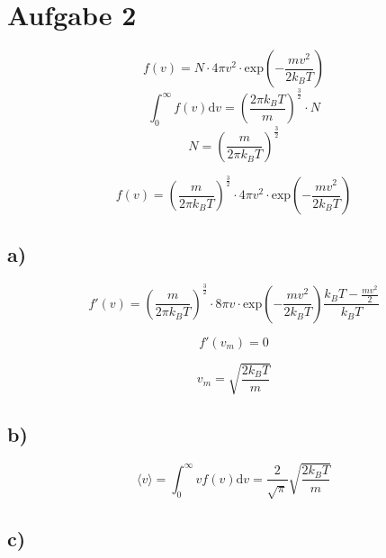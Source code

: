 \section{Aufgabe 2}
\label{sec:Aufgabe2}

\begin{equation}
  f(v)=N\cdot 4\pi v^2 \cdot \text{exp}\left(-\frac{mv^2}{2k_BT}\right)
\end{equation}
\begin{equation}
  \int^{\infty}_{0} f(v) \text{d}v = \left(\frac{2\pi k_B T}{m}\right)^{\frac{3}{2}}\cdot N
\end{equation}
\begin{equation}
  N= \left(\frac{m}{2\pi k_B T}\right)^{\frac{3}{2}}
\end{equation}

\begin{equation}
  f(v)=\left(\frac{m}{2\pi k_B T}\right)^{\frac{3}{2}}\cdot 4\pi v^2 \cdot \text{exp}\left(-\frac{mv^2}{2k_BT}\right)
\end{equation}

\subsection{a)}

\begin{equation}
  f'(v) = \left(\frac{m}{2\pi k_B T}\right)^{\frac{3}{2}}\cdot 8\pi v \cdot \text{exp}\left(-\frac{mv^2}{2k_BT}\right)\frac{k_BT-\frac{mv^2}{2}}{k_BT}
\end{equation}

\begin{equation}
  f'(v_m)=0
\end{equation}

\begin{equation}
  v_m = \sqrt{\frac{2k_BT}{m}}
\end{equation}


\subsection{b)}

\begin{equation}
  \langle v \rangle = \int^{\infty}_{0} v f(v) \text{d}v = \frac{2}{\sqrt{\pi}}\sqrt{\frac{2k_BT}{m}}
\end{equation}

\subsection{c)}

